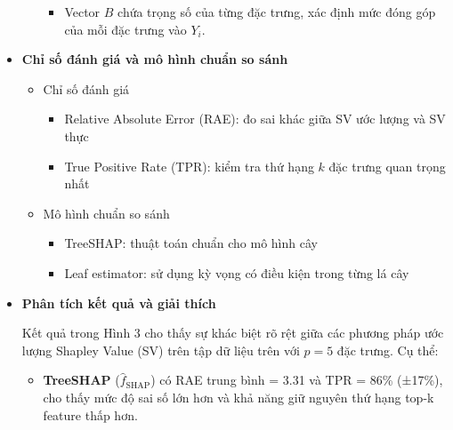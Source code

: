 \documentclass[12pt, a4paper]{article}
\begin{document}
\begin{itemize}[align=parleft, left=4em, labelsep=1em, itemsep=1em]
\begin{itemize}[label=$\circ$, left=1em, labelsep=0.75em, itemsep=0.5em]
             \begin{itemize}[label=$+$, labelsep=0.3em, itemsep=0.2em]
                \item Vector $B$ chứa trọng số của từng đặc trưng, xác định mức đóng góp của mỗi đặc trưng vào $Y_i$.
             \end{itemize}
           
            
        \end{itemize}

        \item \textbf{Chỉ số đánh giá và mô hình chuẩn so sánh}
          \begin{itemize}[label=$\circ$, left=1em, labelsep=0.75em, itemsep=0.5em]
                \item Chỉ số đánh giá
                    \begin{itemize}[label=$+$, labelsep=0.3em, itemsep=0.2em]
                        \item Relative Absolute Error (RAE): đo sai khác giữa SV ước lượng và SV thực
                        \item True Positive Rate (TPR): kiểm tra thứ hạng $k$ đặc trưng quan trọng nhất
                    \end{itemize}
                \item Mô hình chuẩn so sánh
                    \begin{itemize}[label=$+$, labelsep=0.3em, itemsep=0.2em]
                        \item TreeSHAP: thuật toán chuẩn cho mô hình cây
                        \item Leaf estimator: sử dụng kỳ vọng có điều kiện trong từng lá cây
                    \end{itemize}
            \end{itemize}

            \item \textbf{Phân tích kết quả và giải thích}
            
            Kết quả trong Hình 3 cho thấy sự khác biệt rõ rệt giữa các phương pháp ước lượng Shapley Value (SV) trên tập dữ liệu trên với $p=5$ đặc trưng. Cụ thể:
              \begin{itemize}[label=$\circ$, left=1em, labelsep=0.75em, itemsep=0.5em]
                \item \textbf{TreeSHAP} ($\hat{f}_{\text{SHAP}}$) có RAE trung bình = 3.31 và TPR = 86\% (±17\%), cho thấy mức độ sai số lớn hơn và khả năng giữ nguyên thứ hạng top-k feature thấp hơn.  


\end{itemize}
\end{itemize}
\end{document}
